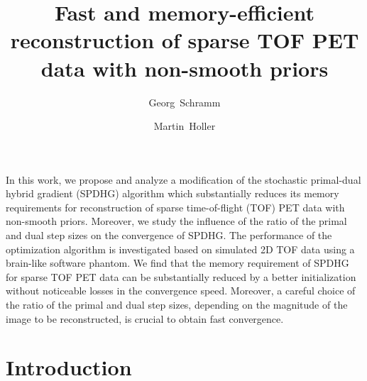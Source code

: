 \documentclass[11pt,twocolumn,twoside]{article}
\begin{document}
\title{Fast and memory-efficient reconstruction of sparse TOF PET data with non-smooth priors} 

\author[1]{Georg~Schramm}
\author[2]{Martin~Holler}



\maketitle
\thispagestyle{fancy}





\begin{customabstract}
In this work, we propose and analyze a modification of the stochastic primal-dual hybrid gradient
(SPDHG) algorithm which substantially reduces its memory requirements 
for reconstruction of sparse time-of-flight (TOF) PET data with non-smooth priors.
Moreover, we study the influence of the ratio of the primal and dual step sizes 
on the convergence of SPDHG.
The performance of the optimization algorithm is investigated based on simulated 2D TOF
data using a brain-like software phantom.
We find that the memory requirement of SPDHG for sparse TOF PET data can be
substantially reduced by a better initialization without noticeable losses in the convergence speed.
Moreover, a careful choice of the ratio of the primal and dual step sizes, 
depending on the magnitude of the image to be reconstructed, is crucial to obtain fast convergence.
\end{customabstract}


\section{Introduction}
\end{document}
